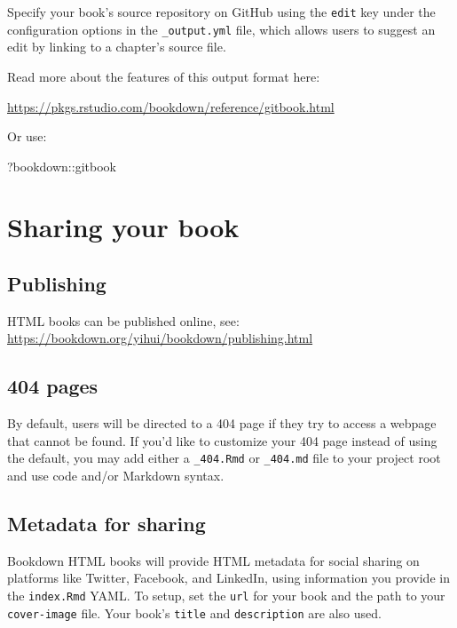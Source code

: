 \documentclass[
]{book}
\newenvironment{Shaded}{\begin{snugshade}}{\end{snugshade}}
\newcommand{\NormalTok}[1]{#1}
\newcommand{\SpecialCharTok}[1]{\textcolor[rgb]{0.00,0.00,0.00}{#1}}
\begin{document}
Specify your book's source repository on GitHub using the \texttt{edit} key under the configuration options in the \texttt{\_output.yml} file, which allows users to suggest an edit by linking to a chapter's source file.

Read more about the features of this output format here:

\url{https://pkgs.rstudio.com/bookdown/reference/gitbook.html}

Or use:

\begin{Shaded}
\begin{Highlighting}[]
\NormalTok{?bookdown}\SpecialCharTok{::}\NormalTok{gitbook}
\end{Highlighting}
\end{Shaded}

\hypertarget{sharing-your-book-4}{%
\chapter{Sharing your book}\label{sharing-your-book-4}}

\hypertarget{publishing-6}{%
\section{Publishing}\label{publishing-6}}

HTML books can be published online, see: \url{https://bookdown.org/yihui/bookdown/publishing.html}

\hypertarget{pages-6}{%
\section{404 pages}\label{pages-6}}

By default, users will be directed to a 404 page if they try to access a webpage that cannot be found. If you'd like to customize your 404 page instead of using the default, you may add either a \texttt{\_404.Rmd} or \texttt{\_404.md} file to your project root and use code and/or Markdown syntax.

\hypertarget{metadata-for-sharing-6}{%
\section{Metadata for sharing}\label{metadata-for-sharing-6}}

Bookdown HTML books will provide HTML metadata for social sharing on platforms like Twitter, Facebook, and LinkedIn, using information you provide in the \texttt{index.Rmd} YAML. To setup, set the \texttt{url} for your book and the path to your \texttt{cover-image} file. Your book's \texttt{title} and \texttt{description} are also used.
\end{document}
